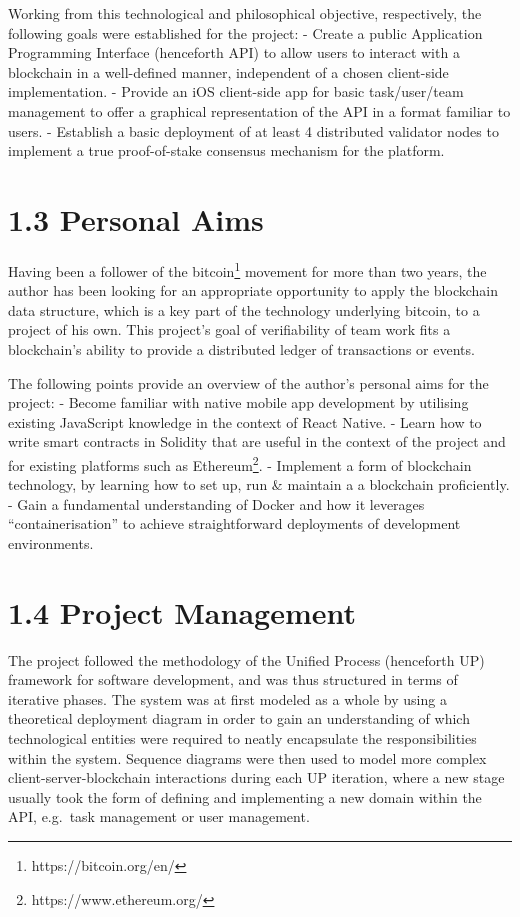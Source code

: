 Working from this technological and philosophical objective,
respectively, the following goals were established for the project: -
Create a public Application Programming Interface (henceforth API) to
allow users to interact with a blockchain in a well-defined manner,
independent of a chosen client-side implementation. - Provide an iOS
client-side app for basic task/user/team management to offer a graphical
representation of the API in a format familiar to users. - Establish a
basic deployment of at least 4 distributed validator nodes to implement
a true proof-of-stake consensus
mechanism\cite{BitFuryGroup2015} for the platform.

\section{1.3 Personal Aims}\label{personal-aims}

Having been a follower of the
bitcoin\footnote{https://bitcoin.org/en/} movement for more than
two years, the author has been looking for an appropriate opportunity to
apply the blockchain data structure, which is a key part of the
technology underlying bitcoin, to a project of his own. This project's
goal of verifiability of team work fits a blockchain's ability to
provide a distributed ledger of transactions or events.

The following points provide an overview of the author's personal aims
for the project: - Become familiar with native mobile app development by
utilising existing JavaScript knowledge in the context of React
Native\cite{2react-native}. - Learn how
to write smart contracts in Solidity\cite{1solidity} that are useful
in the context of the project and for existing platforms such as
Ethereum\footnote{https://www.ethereum.org/}. - Implement a form of blockchain
technology, by learning how to set up, run \& maintain a a blockchain
proficiently. - Gain a fundamental understanding of Docker\cite{1docker} and how it leverages ``containerisation'' to achieve
straightforward deployments of development environments.

\section{1.4 Project Management}\label{project-management}

The project followed the methodology of the Unified Process (henceforth
UP) framework for software
development\cite{jacobson1999unified}, and was thus structured in terms of iterative
phases. The system was at first modeled as a whole by using a
theoretical deployment diagram in order to gain an understanding of
which technological entities were required to neatly encapsulate the
responsibilities within the system. Sequence diagrams were then used to
model more complex client-server-blockchain interactions during each UP
iteration, where a new stage usually took the form of defining and
implementing a new domain within the API, e.g.~task management or user
management.

